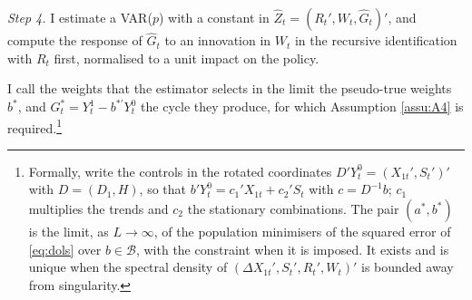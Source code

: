 \documentclass[12pt,a4paper]{article}
\theoremstyle{definition}
\theoremstyle{definition}\newtheorem{example}{Example}
\theoremstyle{definition}\newtheorem{definition}{Definition}
\begin{document}
\textit{Step 4.} I estimate a VAR($p$) with a constant in $\hat Z_t=(R_t',W_t,\hat G_t)'$, and compute the response of $\hat G_t$ to an innovation in $W_t$ in the recursive identification with $R_t$ first, normalised to a unit impact on the policy.

I call the weights that the estimator selects in the limit the pseudo-true weights $b^\ast$, and $G^\ast_t=Y^1_t-b^{\ast\prime}Y^0_t$ the cycle they produce, for which Assumption \ref{assu:A4} is required.\footnote{Formally, write the controls in the rotated coordinates $D'Y^0_t=(X_{1t}',S_t')'$ with $D=(D_1,H)$, so that $b'Y^0_t=c_1'X_{1t}+c_2'S_t$ with $c=D^{-1}b$; $c_1$ multiplies the trends and $c_2$ the stationary combinations. The pair $(a^\ast,b^\ast)$ is the limit, as $L\to\infty$, of the population minimisers of the squared error of \eqref{eq:dols} over $b\in\mathcal{B}$, with the constraint when it is imposed. It exists and is unique when the spectral density of $(\Delta X_{1t}',S_t',R_t',W_t)'$ is bounded away from singularity.}
\end{document}
